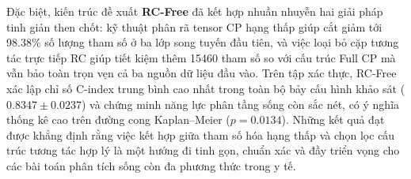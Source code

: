 Đặc biệt, kiến trúc đề xuất \textbf{RC-Free} đã kết hợp nhuần nhuyễn hai giải pháp tinh giản then chốt: kỹ thuật phân rã tensor CP hạng thấp giúp cắt giảm tới 98.38\% số lượng tham số ở ba lớp song tuyến đầu tiên, và việc loại bỏ cặp tương tác trực tiếp RC giúp tiết kiệm thêm 15460 tham số so với cấu trúc Full CP mà vẫn bảo toàn trọn vẹn cả ba nguồn dữ liệu đầu vào. Trên tập xác thực, RC-Free xác lập chỉ số C-index trung bình cao nhất trong toàn bộ bảy cấu hình khảo sát ($0.8347\pm0.0237$) và chứng minh năng lực phân tầng sống còn sắc nét, có ý nghĩa thống kê cao trên đường cong Kaplan--Meier ($p=0.0134$). Những kết quả đạt được khẳng định rằng việc kết hợp giữa tham số hóa hạng thấp và chọn lọc cấu trúc tương tác hợp lý là một hướng đi tinh gọn, chuẩn xác và đầy triển vọng cho các bài toán phân tích sống còn đa phương thức trong y tế.
